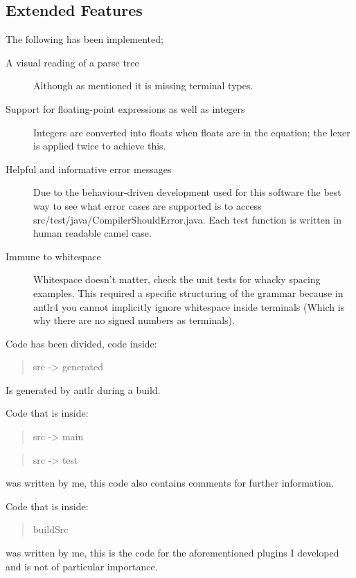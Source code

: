 \documentclass[a4paper,12pt]{article}
\begin{document}
\subsection{Extended Features}
The following has been implemented;
\begin{description}
    \item[A visual reading of a parse tree] \hfill
        Although as mentioned it is missing terminal types.
    \item[Support for floating-point expressions as well as integers] \hfill
        Integers are converted into floats when floats are in the equation; the lexer is applied twice to achieve this.
    \item[Helpful and informative error messages]
        Due to the behaviour-driven development used for this software the best way to see what error cases are supported is to access src/test/java/CompilerShouldError.java. Each test function is written in human readable camel case.
    \item[Immune to whitespace]
       Whitespace doesn't matter, check the unit tests for whacky spacing examples. This required a specific structuring of the grammar because in antlr4 you cannot implicitly ignore whitespace inside terminals (Which is why there are no signed numbers as terminals). 
\end{description}

Code has been divided, code inside:
\begin{quotation}
src -> generated
\end{quotation}
Is generated by antlr during a build.


Code that is inside:
\begin{quotation}
src -> main
\end{quotation}
\begin{quotation}
src -> test
\end{quotation}
was written by me, this code also contains comments for further information.

Code that is inside:
\begin{quotation}
buildSrc
\end{quotation}
was written by me, this is the code for the aforementioned plugins I developed and is not of particular importance.
\end{document}
